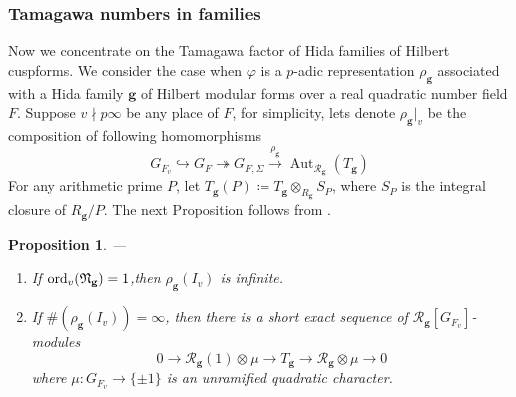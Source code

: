\documentclass[10pt]{amsart}
\numberwithin{equation}{section}
\newtheorem{prop}[thm]{Proposition}
\theoremstyle{definition}
\theoremstyle{remark} %
\DeclareMathOperator{\ord}{ord}
\newcommand{\g}{\mathbf{g}}
\newcommand{\R}{\mathcal{R}}
\begin{document}
	\subsubsection{Tamagawa numbers in families}
	Now we concentrate on the Tamagawa factor of Hida families of Hilbert cuspforms. We consider the case when $ \varphi $ is a $ p $-adic representation $ \rho_\g $ associated with a Hida family $ \g $ of Hilbert modular forms over a real quadratic number field $F$. Suppose $ v \nmid p\infty$ be any place of $ F $, for simplicity, lets denote $ \rho_\g|_{v} $ be the composition of following homomorphisms
	$$ G_{F_v} \hookrightarrow G_F \twoheadrightarrow G_{F,\Sigma} \xrightarrow{\rho_\g} \operatorname{Aut}_{\R_{\g}}(T_\g)$$
	For any arithmetic prime $ P $, let $ T_\g(P)\coloneqq T_\g \otimes_{R_\g} S_P $, where $ S_P $ is the integral closure of $ R_\g/P $. The next Proposition follows from \cite[ .4, .5, .14]{Nek06}.
	\begin{prop}\label{prop:4.16}
		---
		\begin{enumerate}[(1)]
			\item If $\ord_{v}(\frak{N}_\g)=1 $,then $ \rho_\g(I_{v}) $ is infinite.
			\item If $ \#(\rho_\g(I_{v}))= \infty $, then there is a short exact sequence of $ \R_{\g}[G_{F_{v}}] $-modules
			$$ 0 \rightarrow \R_{\g}(1) \otimes \mu \rightarrow T_\g \rightarrow \R_{\g} \otimes \mu \rightarrow 0 $$
			where $ \mu \colon G_{F_v} \rightarrow \{\pm 1\} $ is an unramified quadratic character.
		\end{enumerate}
	\end{prop}
	
\end{document}
